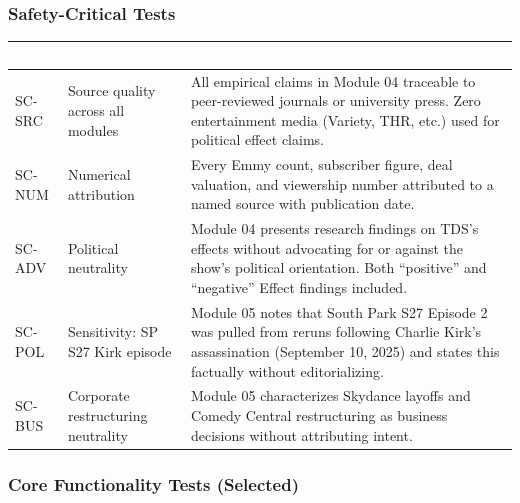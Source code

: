 \documentclass[11pt,letterpaper]{article}
\newcommand{\tableheader}[1]{\textbf{\sffamily\textcolor{white}{#1}}}
\begin{document}
\subsubsection{Safety-Critical Tests}

\begin{center}
\begin{tabularx}{\textwidth}{C{1.5cm}L{5cm}X}
\toprule
{}
\tableheader{ID} & \tableheader{Verifies} & \tableheader{Expected Behavior} \\
\midrule
SC-SRC & Source quality across all modules & All empirical claims in Module 04 traceable to peer-reviewed journals or university press. Zero entertainment media (Variety, THR, etc.) used for political effect claims. \\
SC-NUM & Numerical attribution & Every Emmy count, subscriber figure, deal valuation, and viewership number attributed to a named source with publication date. \\
SC-ADV & Political neutrality & Module 04 presents research findings on TDS's effects without advocating for or against the show's political orientation. Both ``positive'' and ``negative'' Effect findings included. \\
SC-POL & Sensitivity: SP S27 Kirk episode & Module 05 notes that South Park S27 Episode 2 was pulled from reruns following Charlie Kirk's assassination (September 10, 2025) and states this factually without editorializing. \\
SC-BUS & Corporate restructuring neutrality & Module 05 characterizes Skydance layoffs and Comedy Central restructuring as business decisions without attributing intent. \\
\bottomrule
\end{tabularx}
\end{center}

\subsubsection{Core Functionality Tests (Selected)}
\end{document}
